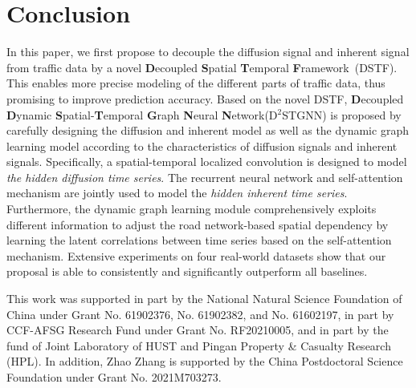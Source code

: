\documentclass[sigconf, nonacm]{acmart}
\begin{document}
  \section{Conclusion}
\label{Section7}
{\color{black}In this paper, we first propose to decouple the diffusion signal and inherent signal from traffic data by a novel  \textbf{D}ecoupled \textbf{S}patial \textbf{T}emporal \textbf{F}ramework~(DSTF).
This enables more precise modeling of the different parts of traffic data, thus promising to improve prediction accuracy.
Based on the novel DSTF, \textbf{D}ecoupled \textbf{D}ynamic \textbf{S}patial-\textbf{T}emporal \textbf{G}raph \textbf{N}eural \textbf{N}etwork(D$^2$STGNN) is proposed by carefully designing the diffusion and inherent model as well as the dynamic graph learning model according to the characteristics of diffusion signals and inherent signals.
Specifically, a spatial-temporal localized convolution is designed to model \textit{the hidden diffusion time series}. The recurrent neural network and self-attention mechanism are jointly used to model the \textit{hidden inherent time series}.
Furthermore, the dynamic graph learning module comprehensively exploits different information to adjust the road network-based spatial dependency by learning the latent correlations between time series based on the self-attention mechanism.
Extensive experiments on four real-world datasets show that our proposal is able to consistently and significantly outperform all baselines.}
 \begin{acks}
This work was supported in part by the National Natural Science Foundation of China under Grant No. 61902376, No. 61902382, and No. 61602197, in part by CCF-AFSG Research Fund under Grant No. RF20210005, and in part by the fund of Joint Laboratory of HUST and Pingan Property \& Casualty Research (HPL).
In addition, Zhao Zhang is supported by the China Postdoctoral Science Foundation under Grant No. 2021M703273.


\end{acks} 



\balance 

\normalem

\end{document}
